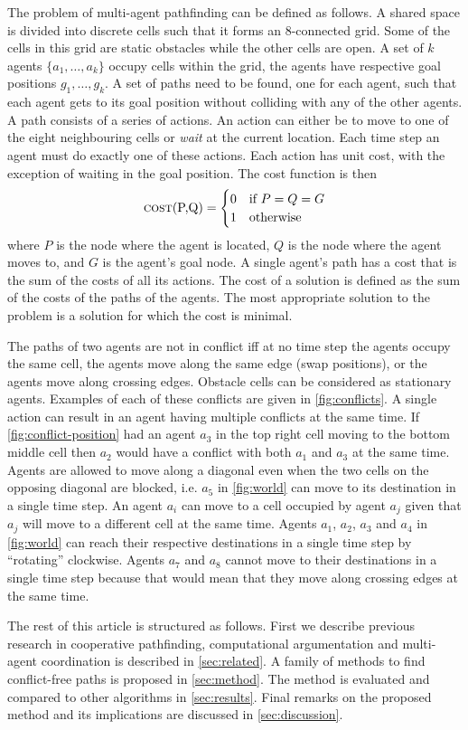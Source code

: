 The problem of multi-agent pathfinding can be defined as follows. A shared
space is divided into discrete cells such that it forms an 8-connected grid.
Some of the cells in this grid are static obstacles while the other cells are
open. A set of $k$ agents $\{a_1, \ldots, a_k\}$ occupy cells within the grid,
the agents have respective goal positions $g_1, \ldots, g_k$. A set of paths
need to be found, one for each agent, such that each agent gets to its goal
position without colliding with any of the other agents. A path consists of a
series of actions. An action can either be to move to one of the eight
neighbouring cells or \emph{wait} at the current location. Each time step an
agent must do exactly one of these actions. Each action has unit cost, with the
exception of waiting in the goal position. The cost function is then
\[
\text{\textsc{cost}(P,Q)} =
\begin{cases}
0 & \text{if } P = Q = G \\
1 & \text{otherwise}
\end{cases}
\]
where $P$ is the node where the agent is located, $Q$ is the node where the
agent moves to, and $G$ is the agent's goal node. A single agent's path has a
cost that is the sum of the costs of all its actions. The cost of a solution is
defined as the sum of the costs of the paths of the agents. The most
appropriate solution to the problem is a solution for which the cost is minimal.

The paths of two agents are not in conflict iff at no time step the agents
occupy the same cell, the agents move along the same edge (swap positions), or
the agents move along crossing edges. Obstacle cells can be considered as
stationary agents. Examples of each of these conflicts are given in
\autoref{fig:conflicts}. A single action can result in an agent having multiple
conflicts at the same time. If \autoref{fig:conflict-position} had an agent
$a_3$ in the top right cell moving to the bottom middle cell then $a_2$ would
have a conflict with both $a_1$ and $a_3$ at the same time. Agents are allowed
to move along a diagonal even when the two cells on the opposing diagonal are
blocked, i.e. $a_5$ in \autoref{fig:world} can move to its destination in a
single time step. An agent $a_i$ can move to a cell occupied by agent $a_j$
given that $a_j$ will move to a different cell at the same time. Agents $a_1$,
$a_2$, $a_3$ and $a_4$ in \autoref{fig:world} can reach their respective
destinations in a single time step by ``rotating'' clockwise. Agents $a_7$ and
$a_8$ cannot move to their destinations in a single time step because that
would mean that they move along crossing edges at the same time.

The rest of this article is structured as follows.
First we describe previous research in cooperative pathfinding, computational 
argumentation and multi-agent coordination is described in 
\autoref{sec:related}.
A family of methods to find
conflict-free paths is proposed in \autoref{sec:method}. The method is
evaluated and compared to other algorithms in \autoref{sec:results}. Final
remarks on the proposed method and its implications are discussed in
\autoref{sec:discussion}.
